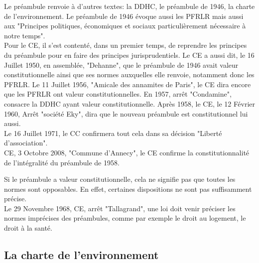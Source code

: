 \documentclass[10pt, a4paper, openany]{book}
\begin{document}
Le préambule renvoie à d'autres textes: la DDHC, le préambule de 1946, la charte de l'environnement. Le préambule de 1946 évoque aussi les PFRLR mais aussi aux "Principes politiques, économiques et sociaux particulièrement nécessaire à notre temps". \\
Pour le CE, il s'est contenté, dans un premier temps, de reprendre les principes du préambule pour en faire des principes jurisprudentiels. Le CE a aussi dit, le 16 Juillet 1950, en assemblée, "Dehanne", que le préambule de 1946 avait valeur constitutionnelle ainsi que ses normes auxquelles elle renvoie, notamment donc les PFRLR. Le 11 Juillet 1956, "Amicale des annamites de Paris", le CE dira encore que les PFRLR ont valeur constitutionnelles. En 1957, arrêt "Condamine", consacre la DDHC ayant valeur constitutionnelle. Après 1958, le CE, le 12 Février 1960, Arrêt "société Eky", dira que le nouveau préambule est constitutionnel lui aussi. \\
Le 16 Juillet 1971, le CC confirmera tout cela dans sa décision "Liberté d'association". \\
CE, 3 Octobre 2008, "Commune d'Annecy", le CE confirme la constitutionnalité de l'intégralité du préambule de 1958. 


Si le préambule a valeur constitutionnelle, cela ne signifie pas que toutes les normes sont opposables. En effet, certaines dispositions ne sont pas suffisamment précise. \\
Le 29 Novembre 1968, CE, arrêt "Tallagrand", une loi doit venir préciser les normes imprécises des préambules, comme par exemple le droit au logement, le droit à la santé. 

\subsection{La charte de l'environnement}
\end{document}
